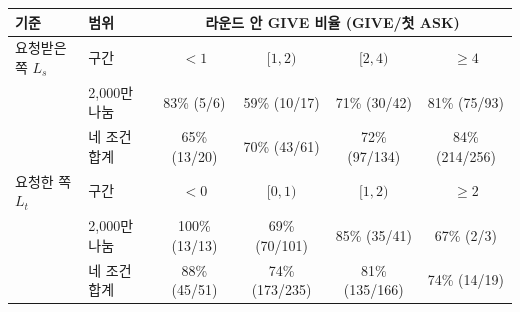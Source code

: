 \begin{tabular}{llcccc}
\toprule
기준 & 범위 & \multicolumn{4}{c}{라운드 안 GIVE 비율 (GIVE/첫 ASK)} \\
\midrule
요청받은 쪽 $L_s$ & 구간 & $<1$ & $[1,2)$ & $[2,4)$ & $\geq4$ \\
 & 2,000만 나눔 & 83\% (5/6) & 59\% (10/17) & 71\% (30/42) & 81\% (75/93) \\
 & 네 조건 합계 & 65\% (13/20) & 70\% (43/61) & 72\% (97/134) & 84\% (214/256) \\
\midrule
요청한 쪽 $L_t$ & 구간 & $<0$ & $[0,1)$ & $[1,2)$ & $\geq2$ \\
 & 2,000만 나눔 & 100\% (13/13) & 69\% (70/101) & 85\% (35/41) & 67\% (2/3) \\
 & 네 조건 합계 & 88\% (45/51) & 74\% (173/235) & 81\% (135/166) & 74\% (14/19) \\
\bottomrule
\end{tabular}
